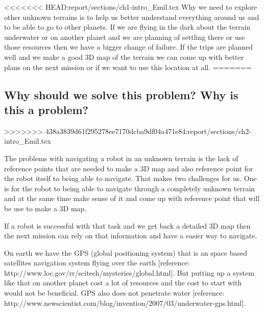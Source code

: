 <<<<<<< HEAD:report/sections/ch1-intro_Emil.tex
Why we need to explore other unknown terrains is to help us better understand everything around us and to be able to go to other planets. If we are flying in the dark about the terrain underwater or on another planet and we are planning of settling there or use those resources then we have a bigger change of failure. If the trips are planned well and we make a good 3D map of the terrain we can come up with better plans on the next mission or if we want to use this location at all. 
=======
\subsection{Why should we solve this problem? Why is this a problem?}
>>>>>>> 438a3839d61f295278ee7170dcba9df04a471e84:report/sections/ch2-intro_Emil.tex

The problems with navigating a robot in an unknown terrain is the lack of reference points that are needed to make a 3D map and also reference point for the robot itself to being able to navigate. That makes two challenges for us. One is for the robot to being able to navigate through a completely unknown terrain and at the same time make sense of it and come up with reference point that will be use to make a 3D map.

If a robot is successful with that task and we get back a detailed 3D map then the next mission can rely on that information and have a easier way to navigate. 

On earth we have the GPS (global positioning system) that is an space based satellites navigation system flying over the earth [reference: http://www.loc.gov/rr/scitech/mysteries/global.html]. But putting up a system like that on another planet cost a lot of resources and the cost to start with would not be beneficial. GPS also does not penetrate water [reference: http://www.newscientist.com/blog/invention/2007/03/underwater-gps.html]. 







